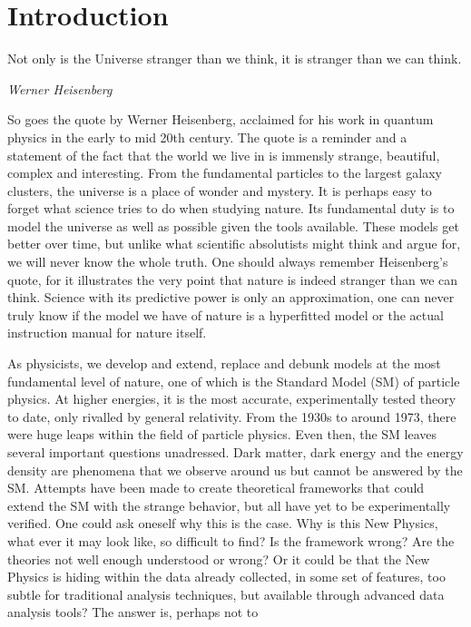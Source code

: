 \chapter*{Introduction}

\epigraph{Not only is the Universe stranger than we think, it is stranger than we can think.}{\textit{Werner Heisenberg}\cite{heisenberg}}
So goes the quote by Werner Heisenberg, acclaimed for his work in quantum physics in the early to mid 
20th century. The quote is a reminder and a statement of the fact that the world we live in is immensly 
strange, beautiful, complex and interesting. From the fundamental particles to the largest galaxy clusters, 
the universe is a place of wonder and mystery. It is perhaps easy to forget what science tries to do
when studying nature. Its fundamental duty is to model the universe as well as possible given the tools 
available. These models get better over time, but unlike what scientific absolutists might think and 
argue for, we will never know the whole truth. One should always remember Heisenberg's quote, for it
illustrates the very point that nature is indeed stranger than we can think. Science with its 
predictive power is only an approximation, one can never truly know if the model we have of nature is 
a hyperfitted model or the actual instruction manual for nature itself. \par 
As physicists, we develop 
and extend, replace and debunk models at the most fundamental level of nature, one of which is
the Standard Model (SM) of particle physics. At higher energies, it is the most accurate, experimentally tested theory to date,
only rivalled by general relativity. From the 1930s to around 1973, there were huge leaps within the field
of particle physics. Even then, the SM leaves several important questions unadressed. Dark matter, dark energy
and the energy density are phenomena that we observe around us but cannot be answered by the SM. 
Attempts have been made to create theoretical frameworks that could extend the SM with the strange behavior, 
but all have yet to be experimentally verified. One could ask oneself why 
this is the case. Why is this New Physics, what ever it may look like, so difficult to find? 
Is the framework wrong? Are the theories not well enough understood or wrong? Or it could be that
the New Physics is hiding within the data already collected, in some set of features, too subtle for
traditional analysis techniques, but available through advanced data analysis tools? The answer is, perhaps not to 
